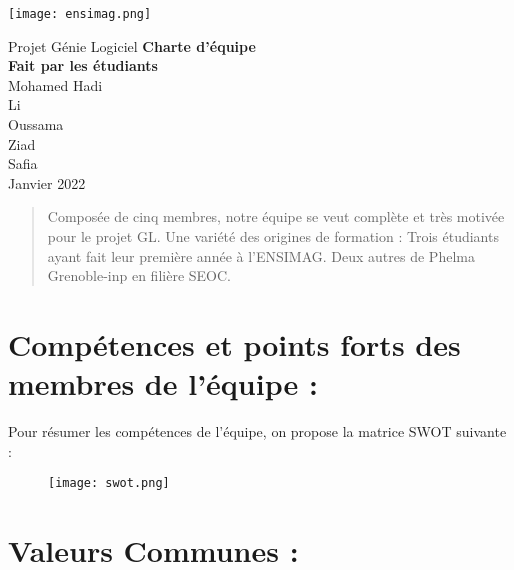 \documentclass[12pt]{article}
\begin{document}
\begin{titlepage}
    \begin{center}
    \texttt{[image: ensimag.png]} 
    \end{center}
    \begin{center}
        \vspace{2cm}
        \large Projet Génie Logiciel
        \vspace{0,5\baselineskip}
        {\Large\textbf{Charte d'équipe}\\
        \vspace*{1\baselineskip}
        \Large\textbf{Fait par les étudiants}}
        \vspace{1\baselineskip}\\
        Mohamed Hadi  \\Li {}\\Oussama {}\\Ziad {}\\ Safia  \\
		\vspace{3.5\baselineskip}
		Janvier 2022
    \end{center}
\end{titlepage}

\newpage

\begin{abstract}
Composée de cinq membres, notre équipe se veut complète et très motivée pour le projet GL.
Une variété des origines de formation :
Trois étudiants ayant fait leur première année à l’ENSIMAG.
Deux autres de Phelma Grenoble-inp en filière SEOC.\\
\end{abstract}


\section{\textbf{Compétences et points forts des membres de l’équipe :}}
Pour résumer les compétences de l’équipe, on propose la matrice SWOT suivante :

 \begin{figure}[h]
\texttt{[image: swot.png]}
\centering
\end{figure}

\newpage

\section{\textbf{Valeurs Communes :}}
\end{document}
